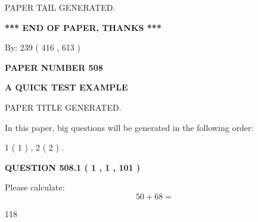 \documentclass[12pt]{article}
\begin{document}
   
   
\vspace{2.0in} PAPER TAIL GENERATED.
   
   
   
   
\vspace{1.0in} 
{\textbf{\large{ *** END OF PAPER, THANKS *** }}} 
   
   
\hspace{1.0in} By: 
 239 ( 416 ,  613 )
   
   
   
   
\newpage 
\setcounter{page}{ 
   508001 } 
   
   
   
   
 {\textbf{ \Large{ PAPER NUMBER  508  }}}
   
   
\vspace{0.2in}
   
   
   
   
   
   
   
   
 \vspace{0.2in}
{\LARGE {\textbf{ A QUICK TEST EXAMPLE}}}
   
   
 PAPER TITLE GENERATED.
   
   
   
\vspace{0.2in}
   
In this paper, big questions will be generated in the following order: 
   
   
   1 ( 1 )
 ,
   2 ( 2 )
 .
  
\vspace{0.2in}
  
{\textbf{\Large{QUESTION
508.1 
 ( 1 , 1 , 101 )
}}}
  
  
 
Please calculate:
\begin{equation}
50 +  %
68 = \nonumber
\end{equation}
 
 
 
\noindent{}
 
 

118
 
 
\noindent{}
 
 
\end{document}
